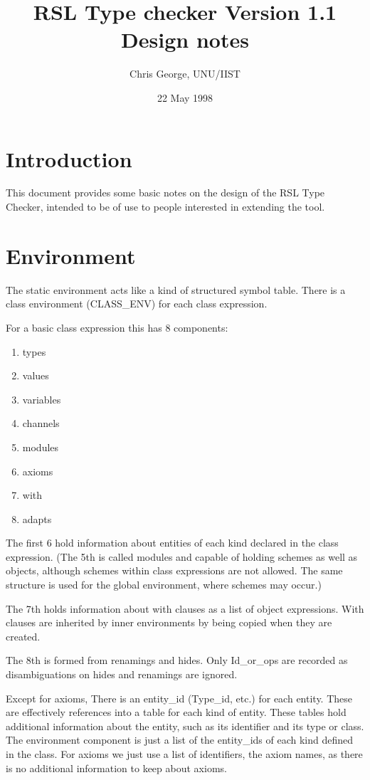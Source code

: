 \documentclass[a4paper]{article}
\title{RSL Type checker Version 1.1\\Design notes}
\author{Chris George, UNU/IIST}
\date{22 May 1998}
\begin{document}
\maketitle


\section{Introduction}
\label{sec:introduction}

This document provides some basic notes on the design of the RSL Type
Checker, intended to be of use to people interested in extending the
tool.


\section{Environment}
\label{sec:environment}

The static environment acts like a kind of structured symbol table.
There is a class environment (CLASS\_ENV) for each class expression.

For a basic class expression this has 8 components:
\begin{enumerate}
\item types
\item values
\item variables
\item channels
\item modules
\item axioms
\item with
\item adapts
\end{enumerate}

The first 6 hold information about entities of each kind declared in
the class expression.  (The 5th is called modules and capable of
holding schemes as well as objects, although schemes within class
expressions are not allowed.  The same structure is used for the
global environment, where schemes may occur.)

The 7th holds information about with clauses as a list of object
expressions.  With clauses are inherited by inner environments by
being copied when they are created.

The 8th is formed from renamings and hides.  Only Id\_or\_ops are
recorded as disambiguations on hides and renamings are ignored.

Except for axioms, There is an entity\_id (Type\_id, etc.) for each
entity.  These are effectively references into a table for each kind
of entity.  These tables hold additional information about the entity,
such as its identifier and its type or class.  The environment
component is just a list of the entity\_ids of each kind defined in
the class.  For axioms we just use a list of identifiers, the axiom
names, as there is no additional information to keep about axioms.
\end{document}
